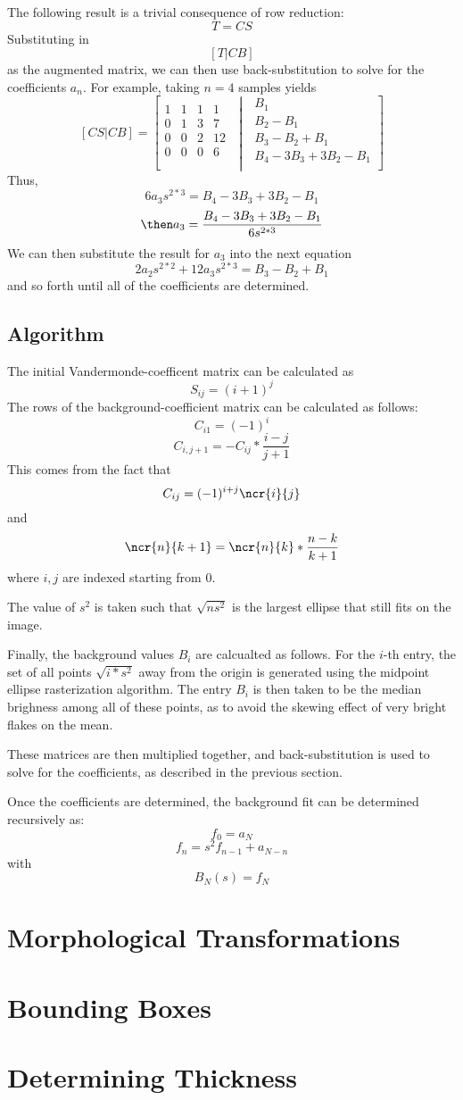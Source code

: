 \documentclass{article}
\begin{document}
The following result is a trivial consequence of row reduction:
\[T=CS\]
Substituting in
\[[T|CB]\]
as the augmented matrix, we can then use back-substitution to solve for the coefficients \(a_n\). For example, taking \(n=4\) samples yields
\[
	[CS\vert CB]=\left[\begin{matrix} 1 & 1 & 1 & 1\\
			0 & 1 & 3 & 7\\
			0 & 0 & 2 & 12\\
			0 & 0 & 0 & 6\\
		\end{matrix}
		\,\,\middle\vert\,\,\begin{matrix}
			B_1\\
			B_2-B_1\\
			B_3-B_2+B_1\\
			B_4-3B_3+3B_2-B_1\\
	\end{matrix}\right]
		\]
Thus,
\[6a_3 s^{2*3}= B_4-3B_3+3B_2-B_1\]
\[\then a_3 = \frac{B_4-3B_3+3B_2-B_1}{6s^{2*3}}\]
We can then substitute the result for \(a_3\) into the next equation
\[2a_2 s^{2*2}+12a_3s^{2*3} = B_3-B_2+B_1\]
and so forth until all of the coefficients are determined.

\subsection{Algorithm}
The initial Vandermonde-coefficent matrix can be calculated as
\[S_{ij}=(i+1)^{j}\]
The rows of the background-coefficient matrix can be calculated as follows:
\[C_{i1}=(-1)^i\]
\[C_{i,j+1}=-C_{ij}*\frac{i-j}{j+1}\]
This comes from the fact that
\[C_{ij}=(-1)^{i+j}\ncr{i}{j}\]
and
\[\ncr{n}{k+1}=\ncr{n}{k}*\frac{n-k}{k+1}\]
where \(i,j\) are indexed starting from \(0\).

The value of \(s^2\) is taken such that \(\sqrt{ns^2}\) is the largest ellipse that still fits on the image. 

Finally, the background values \(B_i\) are calcualted as follows. For the \(i\)-th entry, the set of all points \(\sqrt{i*s^2}\) away from the origin is generated using the midpoint ellipse rasterization algorithm. The entry \(B_i\) is then taken to be the median brighness among all of these points, as to avoid the skewing effect of very bright flakes on the mean.

These matrices are then multiplied together, and back-substitution is used to solve for the coefficients, as described in the previous section. 

Once the coefficients are determined, the background fit can be determined recursively as:
\[f_0=a_N\]
\[f_{n} =s^2f_{n-1} +a_{N-n}\]
with
\[B_N(s)=f_N\]


\section{Morphological Transformations}
\section{Bounding Boxes}
\section{Determining Thickness}
\end{document}
